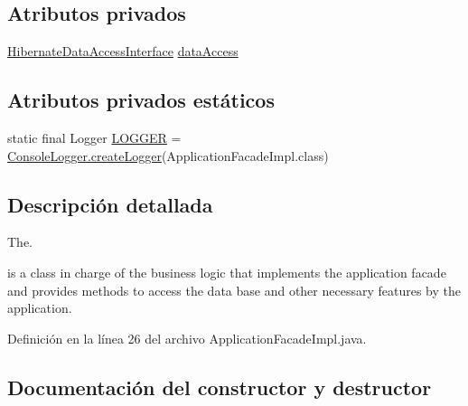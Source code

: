 \subsection*{Atributos privados}
\begin{DoxyCompactItemize}
\item 
\mbox{\hyperlink{interfacecom_1_1ruralhousejsf_1_1data_access_1_1_hibernate_data_access_interface}{Hibernate\+Data\+Access\+Interface}} \mbox{\hyperlink{classcom_1_1ruralhousejsf_1_1business_logic_1_1_application_facade_impl_a96ac80fe606a4649e5fbbbd24935690a}{data\+Access}}
\end{DoxyCompactItemize}
\subsection*{Atributos privados estáticos}
\begin{DoxyCompactItemize}
\item 
static final Logger \mbox{\hyperlink{classcom_1_1ruralhousejsf_1_1business_logic_1_1_application_facade_impl_a4d2aed9fcae945d5ffaa63947bb56cde}{L\+O\+G\+G\+ER}} = \mbox{\hyperlink{classcom_1_1ruralhousejsf_1_1logger_1_1_console_logger_a520321643663e37d95761134a35505cd}{Console\+Logger.\+create\+Logger}}(Application\+Facade\+Impl.\+class)
\end{DoxyCompactItemize}


\subsection{Descripción detallada}
The. 


\begin{DoxyCode}{0}
\end{DoxyCode}
 is a class in charge of the business logic that implements the application facade and provides methods to access the data base and other necessary features by the application. 

Definición en la línea 26 del archivo Application\+Facade\+Impl.\+java.



\subsection{Documentación del constructor y destructor}
\mbox{\label{classcom_1_1ruralhousejsf_1_1business_logic_1_1_application_facade_impl_ad6ed360c754c5ba82a2b88bb4cf036f7}} 
